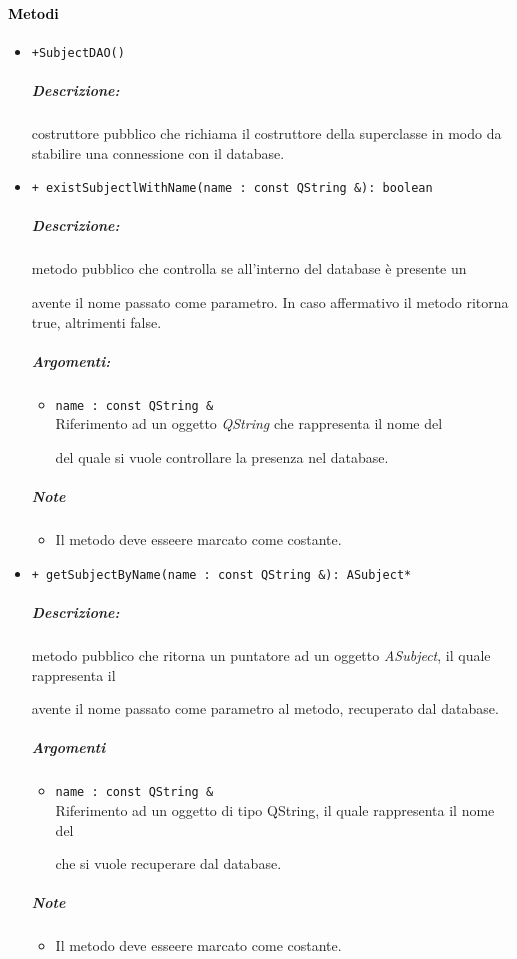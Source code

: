 \paragraph{\textcolor{black}{Metodi\\}}
\begin{itemize}
	\item\color{blue}\verb!+SubjectDAO()!
	\color{black} 
	\subparagraph{Descrizione:} costruttore pubblico che richiama il costruttore della superclasse in modo da stabilire una connessione con il database.
	
	\item \color{blue}\verb!+ existSubjectlWithName(name : const QString &): boolean!
	\color{black} 
	\subparagraph{Descrizione:} metodo pubblico che controlla se all'interno del database è presente un \subject{} avente il nome passato come parametro. In caso affermativo il metodo ritorna true, altrimenti false.\\
	\subparagraph{Argomenti:}
	\begin{itemize}
		\item \color{RoyalPurple}\verb!name : const QString &! \\
		\color{black} Riferimento ad un oggetto \textsl{QString} che rappresenta il nome del \subject{} del quale si vuole controllare la presenza nel database.
	\end{itemize}
	\subparagraph{Note}
		\begin{itemize}
			\item Il metodo deve esseere marcato come costante.
		\end{itemize}
	

	\item\color{blue}\verb!+ getSubjectByName(name : const QString &): ASubject*!
	\color{black} 
	\subparagraph{Descrizione:} metodo pubblico che ritorna un puntatore ad un oggetto \textsl{ASubject}, il quale rappresenta il \subject{} avente il nome passato come parametro al metodo, recuperato dal database.
	\subparagraph{Argomenti}
	\begin{itemize}
		\item \color{RoyalPurple}\verb!name : const QString &! \\ 
		\color{black}Riferimento ad un oggetto di tipo QString, il quale rappresenta il nome del \subject{} che si vuole recuperare dal database.
	\end{itemize}
	\subparagraph{Note}
			\begin{itemize}
				\item Il metodo deve esseere marcato come costante.
			\end{itemize}
			

\end{itemize}
